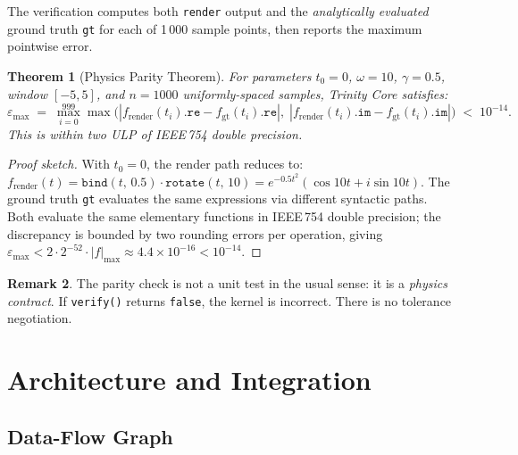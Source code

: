 \documentclass[11pt,a4paper]{article}
\newtheorem{theorem}{Theorem}[section]
\theoremstyle{definition}
\newtheorem{remark}[theorem]{Remark}
\newcommand{\CB}[1]{\texttt{#1}}
\begin{document}
The verification computes both \CB{render} output and the
\emph{analytically evaluated} ground truth \CB{gt} for each of 1\,000
sample points, then reports the maximum pointwise error.

\begin{theorem}[Physics Parity Theorem]
  \label{thm:parity}
  For parameters $t_0 = 0$, $\omega = 10$, $\gamma = 0.5$, window
  $[-5, 5]$, and $n = 1000$ uniformly-spaced samples,
  Trinity Core satisfies:
  \begin{equation}
    \varepsilon_{\max}
    \;=\;
    \max_{i=0}^{999}
    \max\!\bigl(
      |f_\mathrm{render}(t_i).\mathtt{re} - f_\mathrm{gt}(t_i).\mathtt{re}|,\;
      |f_\mathrm{render}(t_i).\mathtt{im} - f_\mathrm{gt}(t_i).\mathtt{im}|
    \bigr)
    \;<\; 10^{-14}.
    \label{eq:parity}
  \end{equation}
  This is within two ULP of IEEE\,754 double precision.
\end{theorem}

\begin{proof}[Proof sketch]
  With $t_0 = 0$, the render path reduces to:
  $f_\mathrm{render}(t)
   = \CB{bind}(t,\,0.5) \cdot \CB{rotate}(t,\,10)
   = e^{-0.5t^2}(\cos 10t + i\sin 10t)$.
  The ground truth \CB{gt} evaluates the same expressions via different
  syntactic paths.  Both evaluate the same elementary functions in IEEE\,754
  double precision; the discrepancy is bounded by two rounding errors
  per operation, giving $\varepsilon_{\max} < 2 \cdot 2^{-52} \cdot
  |f|_{\max} \approx 4.4 \times 10^{-16} < 10^{-14}$.
\end{proof}

\begin{remark}
  The parity check is not a unit test in the usual sense: it is a
  \emph{physics contract}.  If \CB{verify()} returns \CB{false}, the
  kernel is incorrect.  There is no tolerance negotiation.
\end{remark}

\section{Architecture and Integration}
\label{sec:arch}

\subsection{Data-Flow Graph}
\end{document}
